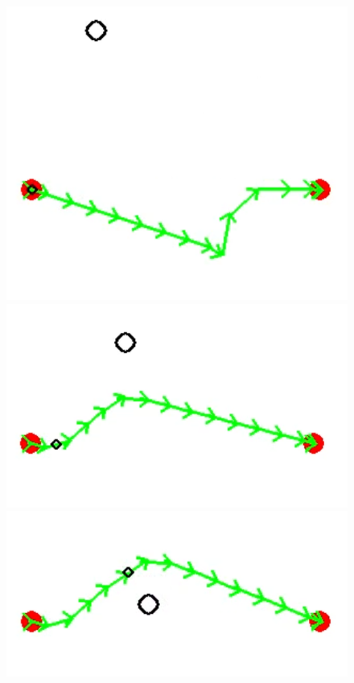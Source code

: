  \begin{figure}[!htb]
    \centering
    \begin{minipage}[b]{.3\linewidth}
        \centering
        \includegraphics[width=0.8\linewidth]{Figures/07_simulation/nonCoop12/nonCoop21.png}
    \end{minipage}%
    \hfill%
    \begin{minipage}[b]{.3\linewidth}
        \centering
        \includegraphics[width=0.8\linewidth]{Figures/07_simulation/nonCoop12/nonCoop22.png}
    \end{minipage}%
    \hfill%
    \begin{minipage}[b]{.3\linewidth}
        \centering
        \includegraphics[width=0.8\linewidth]{Figures/07_simulation/nonCoop12/nonCoop23.png}

\end{minipage}
\end{figure}
